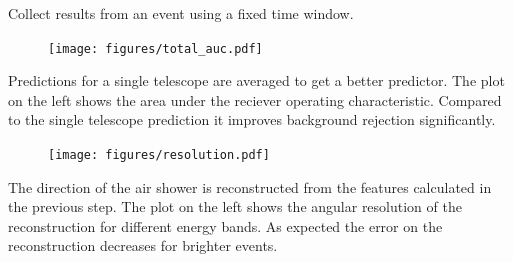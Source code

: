\begin{multicols}{2}
\begin{center}
        \begin{streamblock}[height=2.1cm, colframe=white!60!black,, width=0.8\linewidth]{-5mm}{0}{}%
          \begin{center}
            Collect results from an event using a fixed time window.
          \end{center}
        \end{streamblock}%

        \begin{streamblock}[equal height group=C, width=0.8\linewidth]{0mm}{-5mm}{}%
          \begin{multicols}{2}
            \begin{figure}
              \texttt{[image: figures/total\_auc.pdf]}
            \end{figure}
            \columnbreak
            Predictions for a single telescope are averaged to get a better predictor.
            The plot on the left shows the area under the reciever operating characteristic.
            Compared to the single telescope prediction it improves background rejection significantly.
          \end{multicols}
        \end{streamblock}%

        \begin{streamblock}[equal height group=C, width=0.8\linewidth]{-5mm}{-5mm}{}%
          \begin{multicols}{2}
            \begin{figure}
              \texttt{[image: figures/resolution.pdf]}
            \end{figure}
            \columnbreak
            The direction of the air shower is reconstructed from the features calculated in the previous step.
            The plot on the left shows the angular resolution of the reconstruction for different energy bands.
            As expected the error on the reconstruction decreases for brighter events.
          \end{multicols}
        \end{streamblock}%


\end{center}
\end{multicols}
